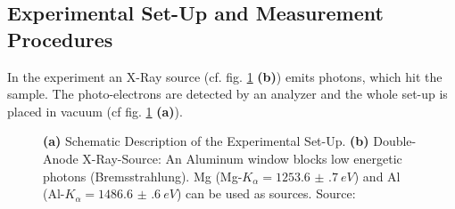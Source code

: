 \documentclass[a4paper]{scrartcl}
\numberwithin{equation}{section}
\numberwithin{figure}{section}
\numberwithin{table}{section}
\begin{document}
\clearpage


\subsection{Experimental Set-Up and Measurement Procedures}

In the experiment an X-Ray source (cf. fig. \ref{fig:setup} \textbf{(b)}) emits photons, which hit the sample. The photo-electrons are detected by an analyzer and the whole set-up is placed in vacuum (cf fig. \ref{fig:setup} \textbf{(a)}).


\begin{figure} 
 \centering
 \hfill

\caption{ \small \textbf{(a)} Schematic Description of the Experimental Set-Up. \textbf{(b)} Double-Anode X-Ray-Source: An Aluminum window blocks low energetic photons (Bremsstrahlung). Mg (Mg-$K_\alpha=\SI{1253.6(7)}{eV}$) and Al (Al-$K_\alpha=\SI{1486.6(6)}{eV}$)  can be used as sources. Source: \cite{script} } 
	\label{fig:setup}
\end{figure}

\FloatBarrier
\end{document}
